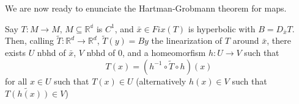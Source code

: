 We are now ready to enunciate the Hartman-Grobmann theorem for maps.

\begin{theorem}
    Say $T: M\rightarrow M,\, M\subseteq\mathbb{R^d}$ is $C^1$, and $\bar{x}\in Fix(T)$ is hyperbolic with $B=D_{\bar{x}}T$. Then, calling $\tilde{T}:\mathbb{R}^d\rightarrow\mathbb{R}^d$, $\tilde{T}(y)=By$ the linearization of $T$ around $\bar{x}$, there exists $U$ nbhd of $\bar{x}$, $V$ nbhd of 0, and a homeomorfism $h: U\rightarrow V$ such that \begin{equation*}
        T(x)=(h^{-1}\circ\tilde{T}\circ h)(x)
    \end{equation*}
    for all $x\in U$ such that $T(x)\in U$ (alternatively $h(x)\in V$ such that $\tilde{T(h(x))}\in V$)
\end{theorem}

